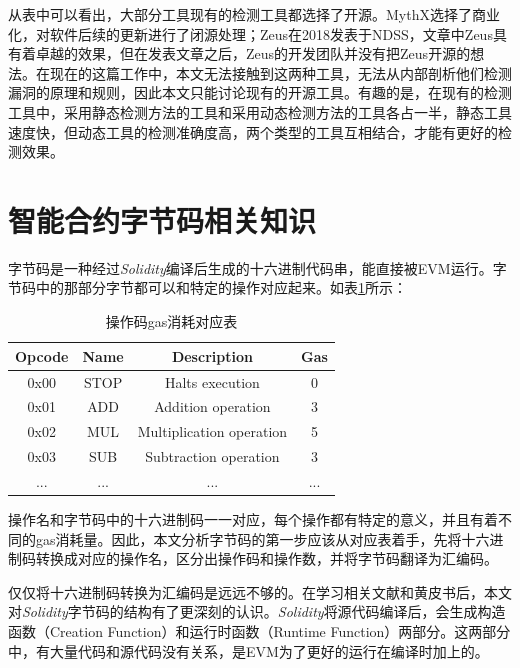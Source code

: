 从表中可以看出，大部分工具现有的检测工具都选择了开源。MythX选择了商业化，对软件后续的更新进行了闭源处理；Zeus在2018发表于NDSS，文章中Zeus具有着卓越的效果，但在发表文章之后，Zeus的开发团队并没有把Zeus开源的想法。在现在的这篇工作中，本文无法接触到这两种工具，无法从内部剖析他们检测漏洞的原理和规则，因此本文只能讨论现有的开源工具。有趣的是，在现有的检测工具中，采用静态检测方法的工具和采用动态检测方法的工具各占一半，静态工具速度快，但动态工具的检测准确度高，两个类型的工具互相结合，才能有更好的检测效果。

\section{智能合约字节码相关知识}

字节码是一种经过\emph{Solidity}编译后生成的十六进制代码串，能直接被EVM运行。字节码中的那部分字节都可以和特定的操作对应起来。如表\ref{tab:opcode_gas}所示：

\begin{table}
  \centering\small
  \caption{操作码gas消耗对应表}
    \begin{tabular}{cccc}
      \toprule
      Opcode & Name & Description & Gas \\
      \midrule
      0x00 & STOP & Halts execution & 0 \\
      0x01 & ADD & Addition operation & 3 \\
      0x02 & MUL & Multiplication operation & 5 \\
      0x03 & SUB & Subtraction operation & 3 \\
      ... & ... & ... & ... \\
      \bottomrule
    \end{tabular}
  \label{tab:opcode_gas}
\end{table}

操作名和字节码中的十六进制码一一对应，每个操作都有特定的意义，并且有着不同的gas消耗量。因此，本文分析字节码的第一步应该从对应表着手，先将十六进制码转换成对应的操作名，区分出操作码和操作数，并将字节码翻译为汇编码。

仅仅将十六进制码转换为汇编码是远远不够的。在学习相关文献和黄皮书后，本文对\emph{Solidity}字节码的结构有了更深刻的认识。\emph{Solidity}将源代码编译后，会生成构造函数（Creation Function）和运行时函数（Runtime Function）两部分。这两部分中，有大量代码和源代码没有关系，是EVM为了更好的运行在编译时加上的。

